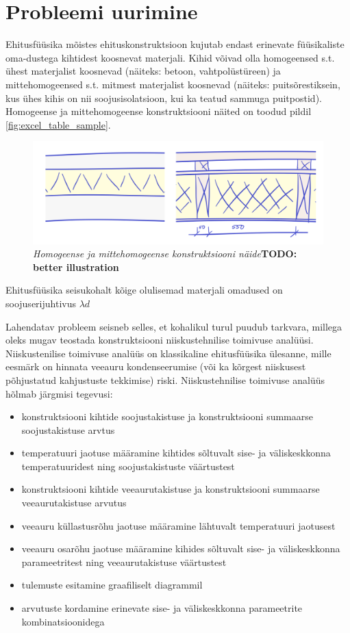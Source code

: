 \section{Probleemi uurimine}

Ehitusfüüsika mõistes ehituskonstruktsioon kujutab endast erinevate füüsikaliste oma-dustega kihtidest 
koosnevat materjali. Kihid võivad olla homogeensed s.t. ühest materjalist koosnevad (näiteks: betoon, vahtpolüstüreen) ja
mittehomogeensed s.t. mitmest materjalist koosnevad (näiteks: puitsõrestiksein, kus ühes kihis on nii soojusisolatsioon, 
kui ka teatud sammuga puitpostid). Homogeense ja mittehomogeense konstruktsiooni näited on toodud pildil \ref{fig:excel_table_sample}.

\begin{figure}[ht]
    \centering
    \includegraphics[width=.8\textwidth]{figures/01_analogues/06_un_non_unif_sample.png}
    \caption{\textit{Homogeense ja mittehomogeense konstruktsiooni näide}\textbf{TODO: better illustration}}
    \label{fig:construction_samples}
\end{figure}

Ehitusfüüsika seisukohalt kõige olulisemad materjali omadused on soojuserijuhtivus \begin{math}\lambda d\end{math}


Lahendatav probleem seisneb selles, et kohalikul turul puudub tarkvara, millega oleks mugav teostada konstruktsiooni
 niiskustehnilise toimivuse analüüsi. Niiskustenilise toimivuse analüüs on klassikaline ehitusfüüsika ülesanne, mille 
 eesmärk on hinnata veeauru kondenseerumise (või ka kõrgest niiskusest põhjustatud kahjustuste tekkimise) riski.
Niiskustehnilise toimivuse analüüs hõlmab järgmisi tegevusi:
\begin{itemize}
    \item konstruktsiooni kihtide soojustakistuse ja konstruktsiooni summaarse soojustakistuse arvtus
    \item temperatuuri jaotuse määramine kihtides sõltuvalt sise- ja väliskeskkonna temperatuuridest ning 
    soojustakistuste väärtustest
    \item konstruktsiooni kihtide veeaurutakistuse ja konstruktsiooni summaarse veeaurutakistuse arvutus
    \item veeauru küllastusrõhu jaotuse määramine lähtuvalt temperatuuri jaotusest
    \item veeauru osarõhu jaotuse määramine kihides sõltuvalt sise- ja väliskeskkonna parameetritest ning 
    veeaurutakistuse väärtustest
    \item tulemuste esitamine graafiliselt diagrammil
    \item arvutuste kordamine erinevate sise- ja väliskeskkonna parameetrite kombinatsioonidega
\end{itemize}

